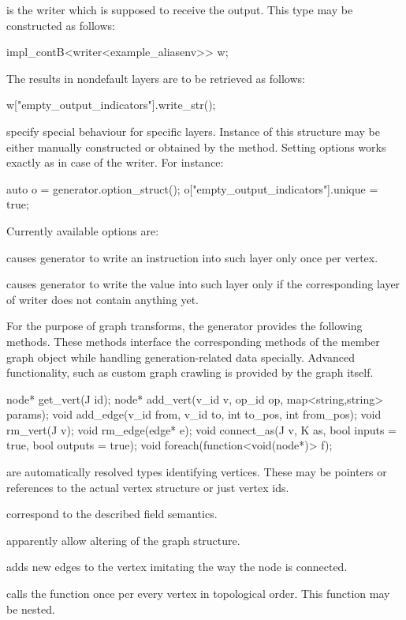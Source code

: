 \begin{description}
\item {} is the writer which is supposed to receive the output. This type may be constructed as follows:
\begin{code}
impl_contB<writer<example_aliasenv>> w;
\end{code}
 The results in nondefault layers are to be retrieved as follows:
\begin{code}
w["empty_output_indicators"].write_str();
\end{code}
\item {} specify special behaviour for specific layers. Instance of this structure may be either manually constructed or obtained by the  method. Setting options works exactly as in case of the writer. For instance:
\begin{code}
auto o = generator.option_struct();
o["empty_output_indicators"].unique = true;
\end{code}
Currently available options are:
\begin{description}
\item {} causes generator to write an instruction into such layer only once per vertex.
\item {} causes generator to write the value into such layer only if the corresponding layer of writer does not contain anything yet.
\end{description}
\end{description}

For the purpose of graph transforms, the generator provides the following methods. These methods interface the corresponding methods of the member graph object while handling generation-related data specially. Advanced functionality, such as custom graph crawling is provided by the graph itself.
\begin{code}
node* get_vert(J id);
node* add_vert(v_id v, op_id op, map<string,string> params);
void add_edge(v_id from, v_id to, int to_pos, int from_pos);
void rm_vert(J v);
void rm_edge(edge* e);
void connect_as(J v, K as, bool inputs = true, bool outputs = true);
void foreach(function<void(node*)> f);
\end{code}

\begin{description}
  \item {} are automatically resolved types identifying vertices. These may be pointers or references to the actual vertex structure or just vertex ids.
  \item {} correspond to the described field semantics.
  \item {} apparently allow altering of the graph structure.
  \item {} adds new edges to the vertex  imitating the way the  node is connected.
  \item {} calls the function  once per every vertex in topological order. This function may be nested.
\end{description}

